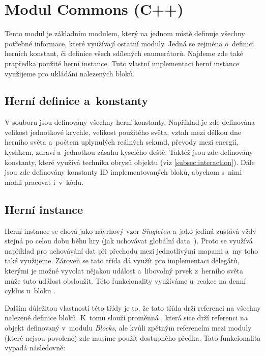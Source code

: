 
\section{Modul Commons (C++)}

Tento modul je základním modulem, který na jednom místě definuje všechny potřebné informace, které využívají ostatní moduly. Jedná se zejména o~definici herních konstant, či definice všech sdílených enumerátorů. Najdeme zde také prapředka použité herní instance. Tuto vlastní implementaci herní instance využijeme pro ukládání nalezených bloků.

\subsection{Herní definice a~konstanty}



V souboru  jsou definovány všechny herní konstanty. Například je zde definována velikost jednotkové krychle, velikost použitého světa, vztah mezi délkou dne herního světa a~počtem uplynulých reálných sekund, převody mezi energií, kyslíkem, zdraví a~jednotkou zásahu kyselého deště. Taktéž jsou zde definovány konstanty, které využívá technika obrysů objektu (viz \ref{subsec:interaction}). Dále jsou zde definovány konstanty ID implementovaných bloků, abychom s~nimi mohli pracovat i~v~kódu.

\subsection{Herní instance}

Herní instance  se chová jako návrhový vzor \textit{Singleton} a~jako jediná zůstává vždy stejná po celou dobu běhu hry (jak uchovávat globální data~\citep{ue_gameInstance}). Proto se využívá například pro uchovávání dat při přechodu mezi jednotlivými mapami a~my toho také využijeme. Zároveň se tato třída dá využít pro implementaci delegátů, kterými je možné vyvolat nějakou událost a~libovolný prvek z~herního světa může tuto událost obsloužit. Této funkcionality využíváme u~reakce na denní cyklus u~bloku .

Dalším důležitou vlastností této třídy je to, že tato třída drží referenci na všechny nalezené definice bloků. K~tomu slouží proměnná , která sice drží referenci na objekt definovaný v~modulu \textit{Blocks}, ale kvůli zpětným referencím mezi moduly (které nejsou povolené) zde musíme použít dostupného předka. Tato funkcionalita vypadá následovně:

